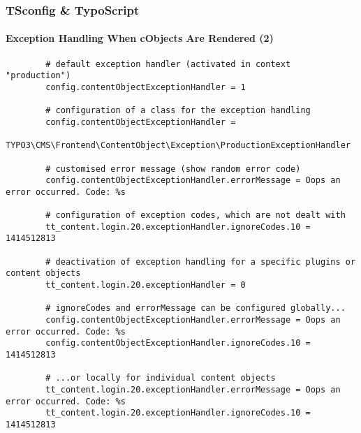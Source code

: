 \begin{frame}[fragile]
	\frametitle{TSconfig \& TypoScript}
	\framesubtitle{Exception Handling When cObjects Are Rendered (2)}

	\lstset{
		basicstyle=\tiny\ttfamily
	}

	\begin{lstlisting}
		# default exception handler (activated in context "production")
		config.contentObjectExceptionHandler = 1

		# configuration of a class for the exception handling
		config.contentObjectExceptionHandler =
		  TYPO3\CMS\Frontend\ContentObject\Exception\ProductionExceptionHandler

		# customised error message (show random error code)
		config.contentObjectExceptionHandler.errorMessage = Oops an error occurred. Code: %s

		# configuration of exception codes, which are not dealt with
		tt_content.login.20.exceptionHandler.ignoreCodes.10 = 1414512813

		# deactivation of exception handling for a specific plugins or content objects
		tt_content.login.20.exceptionHandler = 0

		# ignoreCodes and errorMessage can be configured globally...
		config.contentObjectExceptionHandler.errorMessage = Oops an error occurred. Code: %s
		config.contentObjectExceptionHandler.ignoreCodes.10 = 1414512813

		# ...or locally for individual content objects
		tt_content.login.20.exceptionHandler.errorMessage = Oops an error occurred. Code: %s
		tt_content.login.20.exceptionHandler.ignoreCodes.10 = 1414512813
	\end{lstlisting}

\end{frame}

